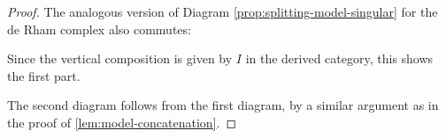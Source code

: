 \documentclass{scrartcl}
\theoremstyle{plain}
\theoremstyle{definition}
\newcommand{\R}{\mathbb R}
\renewcommand{\epsilon}{\varepsilon}
\DeclareMathOperator{\id}{id}
\newcommand{\comp}{\mathbin{\circ}}
\begin{document}
\begin{proof}
    The analogous version of Diagram \ref{prop:splitting-model-singular} for the de Rham complex also commutes:
    \begin{center}
    \end{center}
    Since the vertical composition is given by $I$ in the derived category, this shows the first part. 

    The second diagram follows from the first diagram, by a similar argument as in the proof of \cref{lem:model-concatenation}. 
    





\end{proof}
\end{document}
